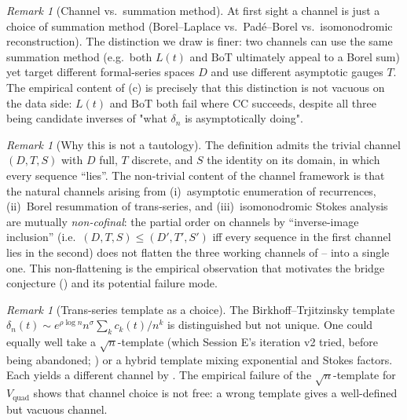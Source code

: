 \documentclass[11pt,reqno]{amsart}
\theoremstyle{plain}
\theoremstyle{definition}
\theoremstyle{remark}
\newtheorem{remark}[theorem]{Remark}
\newcommand{\Lt}{L(t)}
\newcommand{\BoT}{\mathrm{BoT}}
\newcommand{\CC}{\mathrm{CC}}
\newcommand{\Vquad}{V_{\mathrm{quad}}}
\newcommand{\dn}{\delta_{n}}
\begin{document}
\begin{remark}[Channel vs.\ summation method]
\label{rem:channel-vs-sum}
At first sight a channel is just a choice of summation method
(Borel--Laplace vs.\ Pad\'e--Borel vs.\ isomonodromic
reconstruction). The distinction we draw is finer: two
channels can use the same summation method (e.g.\ both $\Lt$
and $\BoT$ ultimately appeal to a Borel sum) yet target
different formal-series spaces $D$ and use different
asymptotic gauges $T$. The empirical content of
(c) is precisely that this distinction
is not vacuous on the data side: $\Lt$ and $\BoT$ both fail
where $\CC$ succeeds, despite all three being candidate
inverses of "what $\dn$ is asymptotically doing".
\end{remark}

\begin{remark}[Why this is not a tautology]
\label{rem:not-tautology}
The definition admits the trivial channel $(D,T,S)$ with $D$
full, $T$ discrete, and $S$ the identity on its domain, in
which every sequence ``lies''. The non-trivial content of
the channel framework is that the natural channels arising
from (i)~asymptotic enumeration of recurrences, (ii)~Borel
resummation of trans-series, and (iii)~isomonodromic Stokes
analysis are mutually \emph{non-cofinal}: the partial order
on channels by ``inverse-image inclusion'' (i.e.\
$(D,T,S) \le (D',T',S')$ iff every sequence in the first
channel lies in the second) does not flatten the three
working channels of -- into a
single one. This non-flattening is the empirical observation
that motivates the bridge conjecture ()
and its potential failure mode.
\end{remark}

\begin{remark}[Trans-series template as a choice]
\label{rem:template}
The Birkhoff--Trjitzinsky template
$\dn(t) \sim e^{\rho \log n} n^{\sigma} \sum_k c_k(t)/n^k$
is distinguished but not unique. One could equally well
take a $\sqrt n$-template (which Session E's iteration v2
tried, before being abandoned;
\cite{siarc_borel_5x}) or a hybrid template
mixing exponential and Stokes factors. Each yields a
different channel by . The empirical
failure of the $\sqrt n$-template for $\Vquad$ shows that
channel choice is not free: a wrong template gives a
well-defined but vacuous channel.
\end{remark}

\end{document}
